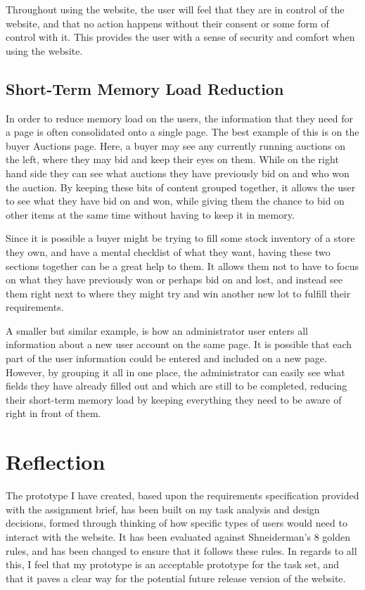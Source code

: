 \documentclass{article}
\begin{document}
Throughout using the website, the user will feel that they are in control of the website, and that no action happens without their consent or some form of control with it. This provides the user with a sense of security and comfort when using the website.

\subsection{Short-Term Memory Load Reduction}
In order to reduce memory load on the users, the information that  they need for a page is often consolidated onto a single page. The best example of this is on the buyer Auctions page. Here, a buyer may see any currently running auctions on the left, where they may bid and keep their eyes on them. While on the right hand side they can see what auctions they have previously bid on and who won the auction. By keeping these bits of content grouped together, it allows the user to see what they have bid on and won, while giving them the chance to bid on other items at the same time without having to keep it in memory.

Since it is possible a buyer might be trying to fill some stock inventory of a store they own, and have a mental checklist of what they want, having these two sections together can be a great help to them. It allows them not to have to focus on what they have previously won or perhaps bid on and lost, and instead see them right next to where they might try and win another new lot to fulfill their requirements.

A smaller but similar example, is how an administrator user enters all information about a new user account on the same page. It is possible that each part of the user information could be entered and included on a new page. However, by grouping it all in one place, the administrator can easily see what fields they have already filled out and which are still to be completed, reducing their short-term memory load by keeping everything they need to be aware of right in front of them.

\clearpage


\section{Reflection}
The prototype I have created, based upon the requirements specification provided with the assignment brief, has been built on my task analysis and design decisions, formed through thinking of how specific types of users would need to interact with the website. It has been evaluated against Shneiderman's 8 golden rules, and has been changed to ensure that it follows these rules. In regards to all this, I feel that my prototype is an acceptable prototype for the task set, and that it paves a clear way for the potential future release version of the website.
\end{document}
